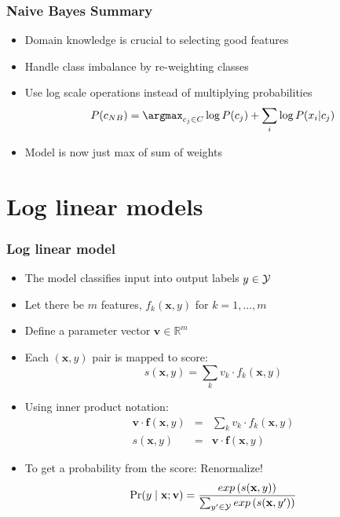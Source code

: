 \begin{frame}
\frametitle{Naive Bayes Summary}
\begin{itemize}[<+->]
\item Domain knowledge is crucial to selecting good features
\item Handle class imbalance by re-weighting classes
\item Use log scale operations instead of multiplying probabilities
\begin{equation*}
P(c_{NB}) = \argmax_{c_j \in C} \log P(c_j) + \sum_{i} \log P(x_i | c_j)
\end{equation*}
\item Model is now just max of sum of weights
\end{itemize}
\end{frame}


\author{Angel Xuan Chang \\ 
  {} \\
  {\color{gray}{adapted from lecture slides from Anoop Sarkar}}
}

\section{Log linear models}
\frame{\tableofcontents[currentsection]}

\begin{frame}
\frametitle{Log linear model}
\begin{itemize}[<+->]
\item The model classifies input into output labels $y \in {\cal Y}$
\item Let there be $m$ features, $f_k(\textbf{x}, y)$ for $k = 1, \ldots, m$
\item Define a parameter vector $\textbf{v} \in \mathbb{R}^m$
\item Each $(\textbf{x}, y)$ pair is mapped to score:
\[ s(\textbf{x}, y) = \sum_k v_k \cdot f_k(\textbf{x}, y) \]
\item Using inner product notation:
\begin{eqnarray*}
\textbf{v} \cdot \textbf{f}(\textbf{x}, y) & = & \sum_k v_k \cdot f_k(\textbf{x}, y) \\
s(\textbf{x}, y) & = & \textbf{v} \cdot \textbf{f}(\textbf{x}, y) 
\end{eqnarray*}
\item To get a probability from the score: Renormalize! 
\[ \Pr(y \mid \textbf{x}; \textbf{v}) = \frac{exp\left(s(\textbf{x}, y)\right)}{\sum_{y' \in {\cal Y}} exp\left(s(\textbf{x}, y')\right)} \]
\end{itemize}
\end{frame}


